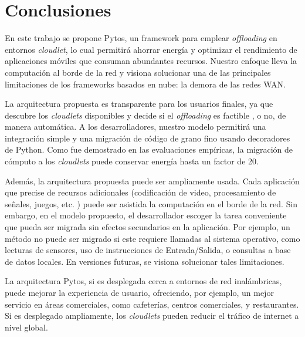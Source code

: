 
\chapter{Conclusiones} %

\label{ch:Chapter8} %


En este trabajo se propone Pytos, un framework para emplear \textit{offloading} en entornos \textit{cloudlet}, lo cual permitirá ahorrar 
energía y optimizar el rendimiento de aplicaciones móviles que consuman abundantes recursos. Nuestro enfoque lleva la computación al borde de 
la red y visiona solucionar una de las principales limitaciones de los frameworks basados en nube: la demora de las redes WAN. 

La arquitectura propuesta es transparente para los usuarios finales, ya que descubre los \textit{cloudlets} disponibles y decide si
el \textit{offloading} es factible , o no, de manera automática. A los desarrolladores, nuestro modelo permitirá una integración simple y una 
migración de código de grano fino usando decoradores de Python. Como fue demostrado en las evaluaciones empíricas, la migración de cómputo 
a los \textit{cloudlets} puede conservar energía hasta un factor de 20.


Además, la arquitectura propuesta puede ser ampliamente usada. Cada aplicación que precise de recursos adicionales (codificación de video, procesamiento
de señales, juegos, etc. ) puede ser asistida la computación en el borde de la red. Sin embargo, en el modelo propuesto, el desarrollador 
escoger la tarea conveniente que pueda ser migrada sin efectos secundarios en la aplicación. Por ejemplo, un método no puede ser migrado si este 
requiere llamadas al sistema operativo, como lecturas de sensores, uso de instrucciones de Entrada/Salida, o consultas a base de datos locales. 
En versiones futuras, se visiona solucionar tales limitaciones.

La arquitectura Pytos, si es desplegada cerca a entornos de red inalámbricas, puede mejorar la experiencia de usuario, ofreciendo, por ejemplo, 
un mejor servicio en áreas comerciales, como cafeterías, centros comerciales, y restaurantes. Si es desplegado ampliamente, 
los \textit{cloudlets} pueden reducir el tráfico de internet a nivel global. 

